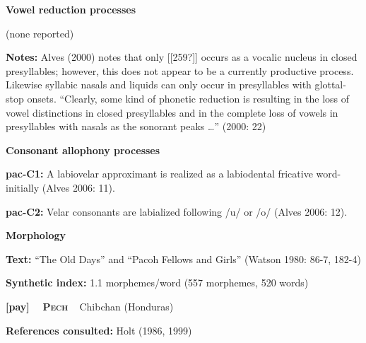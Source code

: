 \begin{styleBody}
\textbf{Vowel reduction processes}
\end{styleBody}

\begin{styleBody}
(none reported)
\end{styleBody}

\begin{styleBody}
\textbf{Notes: }Alves (2000) notes that only [[259?]] occurs as a vocalic nucleus in closed presyllables; however, this does not appear to be a currently productive process. Likewise syllabic nasals and liquids can only occur in presyllables with glottal-stop onsets. “Clearly, some kind of phonetic reduction is resulting in the loss of vowel distinctions in closed presyllables and in the complete loss of vowels in presyllables with nasals as the sonorant peaks …” (2000: 22)
\end{styleBody}

\begin{styleBody}
\textbf{Consonant allophony processes}
\end{styleBody}

\begin{styleBody}
\textbf{pac-C1: }A labiovelar approximant is realized as a labiodental fricative word-initially (Alves 2006: 11).
\end{styleBody}

\begin{styleBody}
\textbf{pac-C2: }Velar consonants are labialized following /u/ or /o/ (Alves 2006: 12).
\end{styleBody}

\begin{styleBody}
\textbf{Morphology}
\end{styleBody}

\begin{styleBody}
\textbf{Text:} “The Old Days” and “Pacoh Fellows and Girls” (Watson 1980: 86-7, 182-4)
\end{styleBody}

\begin{styleBody}
\textbf{Synthetic index: }1.1 morphemes/word (557 morphemes, 520 words)
\end{styleBody}

\clearpage\begin{styleBody}
\textbf{[pay] }\ \ \textbf{\textsc{Pech}}\textbf{\ \ }Chibchan (Honduras)
\end{styleBody}

\begin{styleBody}
\textbf{References consulted: }Holt (1986, 1999)
\end{styleBody}

